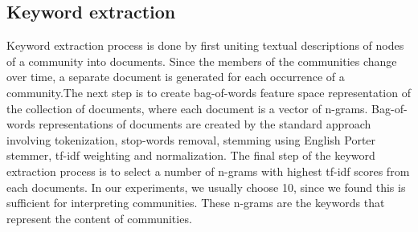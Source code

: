 \documentclass{article} %
\begin{document}
\subsection{Keyword extraction}
Keyword extraction process is done by first uniting textual descriptions of nodes of a community into documents. Since the members of the communities change over time, a separate document is generated for each occurrence of a community.The next step is to create bag-of-words feature space representation of the collection of documents, where each document is a vector of n-grams. Bag-of-words representations of documents are created by the standard approach involving tokenization, stop-words removal, stemming using English Porter stemmer, tf-idf weighting and normalization. The final step of the keyword extraction process is to select a number of n-grams with highest tf-idf scores from each documents.  In our experiments, we usually choose 10, since we found this is sufficient for interpreting communities. These n-grams are the keywords that represent the content of communities.
\end{document}
